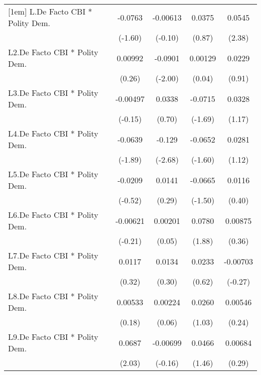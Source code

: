 {\begin{longtable}{l*{4}{c}}
[1em]
L.De Facto CBI * Polity Dem.&  -0.0763         & -0.00613         &   0.0375         &   0.0545\sym{*}  \\
                &  (-1.60)         &  (-0.10)         &   (0.87)         &   (2.38)         \\
[1em]
L2.De Facto CBI * Polity Dem.&  0.00992         &  -0.0901\sym{*}  &  0.00129         &   0.0229         \\
                &   (0.26)         &  (-2.00)         &   (0.04)         &   (0.91)         \\
[1em]
L3.De Facto CBI * Polity Dem.& -0.00497         &   0.0338         &  -0.0715         &   0.0328         \\
                &  (-0.15)         &   (0.70)         &  (-1.69)         &   (1.17)         \\
[1em]
L4.De Facto CBI * Polity Dem.&  -0.0639         &   -0.129\sym{**} &  -0.0652         &   0.0281         \\
                &  (-1.89)         &  (-2.68)         &  (-1.60)         &   (1.12)         \\
[1em]
L5.De Facto CBI * Polity Dem.&  -0.0209         &   0.0141         &  -0.0665         &   0.0116         \\
                &  (-0.52)         &   (0.29)         &  (-1.50)         &   (0.40)         \\
[1em]
L6.De Facto CBI * Polity Dem.& -0.00621         &  0.00201         &   0.0780         &  0.00875         \\
                &  (-0.21)         &   (0.05)         &   (1.88)         &   (0.36)         \\
[1em]
L7.De Facto CBI * Polity Dem.&   0.0117         &   0.0134         &   0.0233         & -0.00703         \\
                &   (0.32)         &   (0.30)         &   (0.62)         &  (-0.27)         \\
[1em]
L8.De Facto CBI * Polity Dem.&  0.00533         &  0.00224         &   0.0260         &  0.00546         \\
                &   (0.18)         &   (0.06)         &   (1.03)         &   (0.24)         \\
[1em]
L9.De Facto CBI * Polity Dem.&   0.0687\sym{*}  & -0.00699         &   0.0466         &  0.00684         \\
                &   (2.03)         &  (-0.16)         &   (1.46)         &   (0.29)         \\

\end{longtable}}
